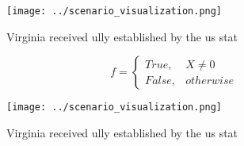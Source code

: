 \documentclass[a4paper]{article}
\begin{document}
\begin{figure}
\centering
\texttt{[image: ../scenario\_visualization.png]}
\caption{Virginia received ully established by the us stat
}
\end{figure}
 
\begin{equation}   f =
\begin{cases} True, & X \neq 0\\
False, & otherwise
\end{cases}
\end{equation}

\begin{figure}
\centering
\texttt{[image: ../scenario\_visualization.png]}
\caption{Virginia received ully established by the us stat
}
\end{figure}
 
\end{document}
